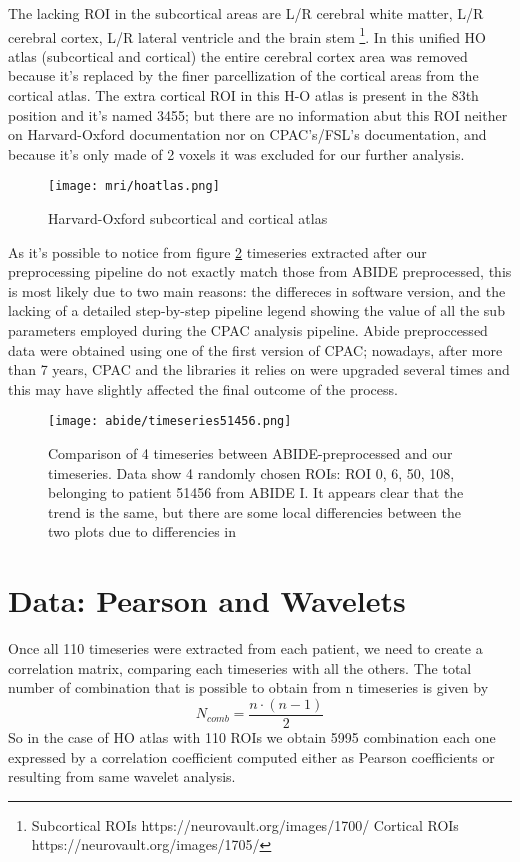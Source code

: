 \documentclass[a4paper,11pt]{article}
\begin{document}
The lacking ROI in the subcortical areas are L/R cerebral white matter, L/R cerebral cortex, L/R lateral ventricle and the brain stem \footnote{Subcortical ROIs https://neurovault.org/images/1700/ \quad Cortical ROIs https://neurovault.org/images/1705/ }.
In this unified HO atlas (subcortical and cortical) the entire cerebral cortex area was removed because it's replaced by the finer parcellization of the cortical areas from the cortical atlas.
The extra cortical ROI in this H-O atlas is present in the 83th position and it's named 3455; but there are no information abut this ROI neither on Harvard-Oxford documentation nor on CPAC's/FSL's documentation, and because it's only made of 2 voxels it was excluded for our further analysis.

\begin{figure}[h]
\centering
\texttt{[image: mri/hoatlas.png]}
\caption{Harvard-Oxford subcortical and cortical atlas}
\label{fig:hoatlas}
\end{figure}


As it's possible to notice from figure \ref{fig:confrontoabidepreproc} timeseries extracted after our preprocessing pipeline do not exactly match those from ABIDE preprocessed, this is most likely due to two main reasons: the differeces in software version, and the lacking of a detailed step-by-step pipeline legend showing the value of all the sub parameters employed during the CPAC analysis pipeline.
Abide preproccessed data were obtained using one of the first version of CPAC; nowadays, after more than 7 years, CPAC and the libraries it relies on were upgraded several times and this may have slightly affected the final outcome of the process.

\begin{figure}[h]
\centering
\texttt{[image: abide/timeseries51456.png]}
\caption{Comparison of 4 timeseries between ABIDE-preprocessed and our timeseries. Data show 4 randomly chosen ROIs: ROI 0, 6, 50, 108, belonging to patient 51456 from ABIDE I.
It appears clear that the trend is the same, but there are some local differencies between the two plots due to differencies in }
\label{fig:confrontoabidepreproc}
\end{figure}













\section{Data: Pearson and Wavelets}
Once all 110 timeseries were extracted from each patient, we need to create a correlation matrix, comparing each timeseries with all the others.
The total number of combination that is possible to obtain from n timeseries is given by
\begin{equation}
N_{comb} = \frac{n\cdot(n-1)}{2}
\end{equation}
So in the case of HO atlas with 110 ROIs we obtain 5995 combination each one expressed by a correlation coefficient computed either as Pearson coefficients or resulting from same wavelet analysis.
\end{document}

